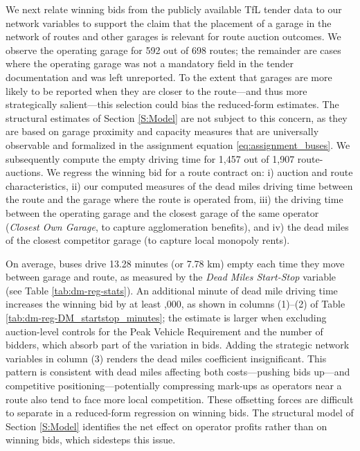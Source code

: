 \documentclass[12pt]{article}
\begin{document}
We next relate winning bids from the publicly available TfL tender data to our 
network variables to support the claim that the placement of a garage in the network of 
routes and other garages is relevant for route auction outcomes. We observe the 
operating garage for 592 out of 698 routes; the remainder are cases where the 
operating garage was not a mandatory field in the tender documentation and was 
left unreported. To the extent that garages are more likely to be reported when 
they are closer to the route---and thus more strategically salient---this 
selection could bias the reduced-form estimates. The structural estimates of 
Section \ref{S:Model} are not subject to this concern, as they are based on 
garage proximity and capacity measures that are universally observable and 
formalized in the assignment equation \eqref{eq:assignment_buses}. We 
subsequently compute the empty driving time for 1,457 out of 1,907 
route-auctions. We regress the winning bid for a route contract on: i) auction 
and route characteristics, ii) our computed measures of the dead miles driving 
time between the route and the garage where the route is operated from, iii) 
the driving time between the operating garage and the closest garage of the same 
operator (\emph{Closest Own Garage}, to capture agglomeration benefits), and 
iv) the dead miles of the closest competitor garage (to capture local monopoly 
rents).

On average, buses drive 13.28 minutes (or 7.78 km) empty each time they move 
between garage and route, as measured by the \emph{Dead Miles Start-Stop} 
variable (see Table \ref{tab:dm-reg-stats}). An additional minute of dead mile driving time increases the winning bid by 
at least ,000, as shown in columns (1)--(2) of Table 
\ref{tab:dm-reg-DM_startstop_minutes}; the estimate is larger when excluding 
auction-level controls for the Peak Vehicle Requirement and the number of 
bidders, which absorb part of the variation in bids. Adding the strategic 
network variables in column (3) renders the dead miles coefficient insignificant. This pattern is consistent with dead miles affecting both costs---pushing bids 
up---and competitive positioning---potentially compressing mark-ups as operators 
near a route also tend to face more local competition. These offsetting forces 
are difficult to separate in a reduced-form regression on winning bids. The 
structural model of Section \ref{S:Model} identifies the net effect on operator 
profits rather than on winning bids, which sidesteps this issue. 
\end{document}
